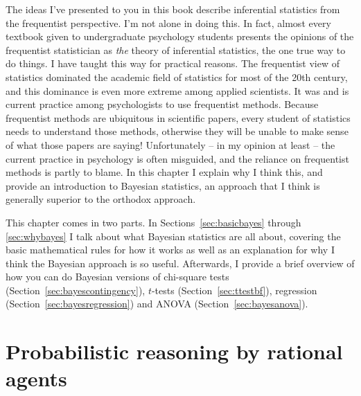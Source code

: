 \bigskip

The ideas I've presented to you in this book describe inferential statistics from the frequentist perspective. I'm not alone in doing this. In fact, almost every textbook given to undergraduate psychology students presents the opinions of the frequentist statistician as {\it the} theory of inferential statistics, the one true way to do things. I have taught this way for practical reasons. The frequentist view of statistics dominated the academic field of statistics for most of the 20th century, and this dominance is even more extreme among applied scientists. It was and is current practice among psychologists to use frequentist methods. Because frequentist methods are ubiquitous in scientific papers, every student of statistics needs to understand those methods, otherwise they will be unable to make sense of what those papers are saying! Unfortunately -- in my opinion at least -- the current practice in psychology is often misguided, and the reliance on frequentist methods is partly to blame. In this chapter I explain why I think this, and provide an introduction to Bayesian statistics, an approach that I think is generally superior to the orthodox approach.

This chapter comes in two parts. In Sections~\ref{sec:basicbayes} through \ref{sec:whybayes} I talk about what Bayesian statistics are all about, covering the basic mathematical rules for how it works as well as an explanation for why I think the Bayesian approach is so useful. Afterwards, I provide a brief overview of how you can do Bayesian versions of chi-square tests (Section~\ref{sec:bayescontingency}), $t$-tests (Section~\ref{sec:ttestbf}), regression (Section~\ref{sec:bayesregression}) and ANOVA (Section~\ref{sec:bayesanova}).


\section{Probabilistic reasoning by rational agents\label{sec:basicbayes}}



